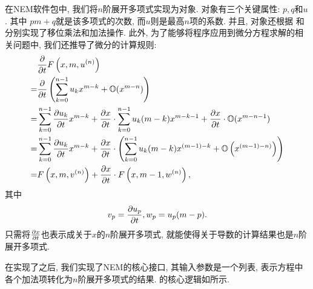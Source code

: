 在NEM软件包中, 我们将$n$阶展开多项式实现为对象. 对象有三个关键属性: $p,q$和$u$. 其中 $pm+q$就是该多项式的次数, 而$u$则是最高$n$项的系数. 并且, 对象还根据\D {} 和  分别实现了移位\D 乘法和加法操作. 此外, 为了能够将程序应用到微分方程求解的相关问题中, 我们还推导了微分的计算规则:
\begin{equation}
\begin{split}
& \frac{\partial}{\partial t}F\left(x,m,u^{(n)}\right)  \\
=& \frac{\partial}{\partial t}\left(\sum_{k=0}^{n-1}{u_k x^{m-k}}+\mathbb O(x^{m-n})\right) \\
=& \sum_{k=0}^{n-1}{\frac{\partial u_k}{\partial t}x^{m-k}}+\frac{\partial x}{\partial t}\cdot\sum_{k=0}^{n-1}{u_k (m-k) x^{m-k-1}}+\frac{\partial x}{\partial t}\cdot\mathbb O(x^{m-n-1}) \\
=& \sum_{k=0}^{n-1}{\frac{\partial u_k}{\partial t}x^{m-k}}+\frac{\partial x}{\partial t}\cdot\left(\sum_{k=0}^{n-1}{u_k (m-k) x^{(m-1)-k}}+\mathbb O\left(x^{(m-1)-n)}\right)\right) \\ 
=& F\left(x,m,v^{(n)}\right)+\frac{\partial x}{\partial t}\cdot F\left(x,m-1,w^{(n)}\right), 
\end{split}\label{NEM-diff}
\end{equation}
其中 
\begin{equation}
v_p=\frac{\partial u_p}{\partial t}, w_p=u_p(m-p).
\end{equation}
只需将$\frac{\partial x}{\partial t}$也表示成关于$x$的$n$阶展开多项式, 就能使得关于导数的计算结果也是$n$阶展开多项式. 

在实现了之后, 我们实现了NEM的核心接口, 其输入参数是一个列表, 表示方程中各个加法项转化为$n$阶展开多项式的结果. 的核心逻辑如所示. 

